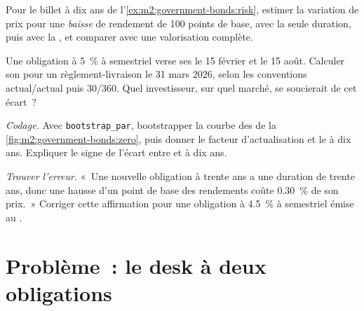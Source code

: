 \begin{exercise}[$\star\star$]\label{exo:m2:government-bonds:5}
Pour le billet à dix ans de l'\cref{ex:m2:government-bonds:risk}, estimer la
variation de prix pour une \emph{baisse} de rendement de 100 points de base, avec la seule duration,
puis avec la , et comparer avec une valorisation complète.
\end{exercise}

\begin{exercise}[$\star\star$]\label{exo:m2:government-bonds:6}
Une obligation à 5~\% à  semestriel verse ses  le 15 février et le 15 août. Calculer son  pour un règlement-livraison le 31 mars 2026, selon les conventions actual/actual puis 30/360.
Quel investisseur, sur quel marché, se soucierait de cet écart~?
\end{exercise}

\begin{exercise}[$\star\star\star$]\label{exo:m2:government-bonds:7}
\emph{Codage.} Avec \texttt{bootstrap\_par}, bootstrapper la courbe des  de
la \cref{fig:m2:government-bonds:zero}, puis donner le facteur d'actualisation et
le  à dix ans. Expliquer le signe de l'écart entre  et  à dix ans.
\end{exercise}

\begin{exercise}[$\star\star\star$]\label{exo:m2:government-bonds:8}
\emph{Trouver l'erreur.} «~Une nouvelle obligation à trente ans a une duration de trente
ans, donc une hausse d'un point de base des rendements coûte 0.30~\% de son prix.~»
Corriger cette affirmation pour une obligation à 4.5~\% à  semestriel émise au .
\end{exercise}

\section{Problème~: le desk à deux obligations}

